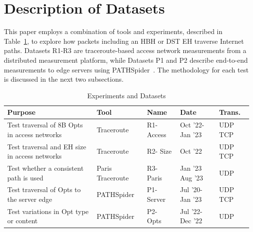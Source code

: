 \documentclass[conference]{IEEEtran}
\begin{document}





\section{Description of Datasets} 
\label{sec:methodology}

This paper employs a combination of tools and experiments, described in Table~\ref{tbl:datasets}, to explore how packets including an HBH or DST EH traverse Internet paths. 
Datasets R1-R3 are traceroute-based access network measurements from a distributed measurement platform, while  Datasets P1 and P2 describe end-to-end measurements to edge servers using PATHSpider~\cite{learmonth2016pathspider}.
The methodology for each test is discussed in the next two subsections.

\begin{table}
\caption{Experiments and Datasets}
\begin{tabular}{p{}|p{}|p{}|p{}|p{}}
Purpose                                                                          & Tool         & Name & Date               & Trans. \\
\hline
\hline
Test traversal of 8B Opts in access networks             & Traceroute       & R1- Access        & Oct '22- Jan '23 & UDP TCP          \\
\hline
Test traversal and EH size in access networks           & Traceroute       & R2- Size           & Oct '22           & UDP TCP          \\
\hline
Test whether a consistent path is used 			& Paris Traceroute & R3- Paris        & Jan '23 Aug '23           & UDP               \\
\hline
Test traversal of Opts to the server edge              & PATHSpider       & P1- Server            & Jul '20- Jan '23 & UDP TCP          \\
\hline
Test variations in Opt type or content        & PATHSpider       & P2- Opts        & Jul '22- Dec '22     & UDP              
\end{tabular}
  \label{tbl:datasets}
\end{table}
    
\end{document}

